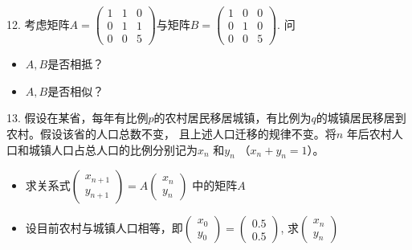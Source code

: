 
\begin{frame}

12. 考虑矩阵$A = \begin{pmatrix} 1 & 1 & 0 \\ 0 & 1 & 1 \\ 0 & 0 & 5 \end{pmatrix}$与矩阵$B = \begin{pmatrix} 1 & 0 & 0 \\ 0 & 1 & 0 \\ 0 & 0 & 5 \end{pmatrix}$. 问
\begin{itemize}
\item[(1)] $A,B$是否相抵？
\item[(2)] $A,B$是否相似？
\end{itemize}

\vspace{1em}

13. 假设在某省，每年有比例$p$的农村居民移居城镇，有比例为$q$的城镇居民移居到农村。假设该省的人口总数不变，
且上述人口迁移的规律不变。将$n$ 年后农村人口和城镇人口占总人口的比例分别记为$x_n$ 和$y_n$ （$x_n+y_n=1$）。
\begin{itemize}
\item[(1)] 求关系式$\begin{pmatrix} x_{n+1} \\ y_{n+1} \end{pmatrix} = A \begin{pmatrix} x_n \\ y_n \end{pmatrix}$ 中的矩阵$A$
\item[(2)] 设目前农村与城镇人口相等，即$\begin{pmatrix} x_0 \\ y_0 \end{pmatrix} = \begin{pmatrix} 0.5 \\ 0.5 \end{pmatrix}$,
求$\begin{pmatrix} x_{n} \\ y_{n} \end{pmatrix}$
\end{itemize}

\end{frame}


